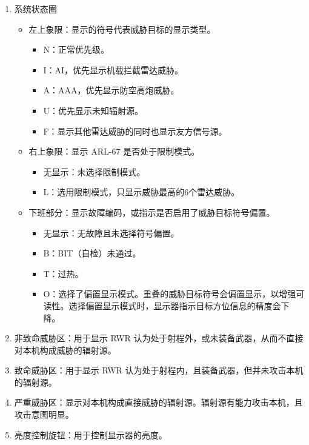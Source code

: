 \begin{enumerate}
	\item 系统状态圈
	      \begin{itemize}
		      \item 左上象限：显示的符号代表威胁目标的显示类型。
		            \begin{itemize}
			            \item N：正常优先级。
			            \item I：AI，优先显示机载拦截雷达威胁。
			            \item A：AAA，优先显示防空高炮威胁。
			            \item U：优先显示未知辐射源。
			            \item F：显示其他雷达威胁的同时也显示友方信号源。
		            \end{itemize}
		      \item 右上象限：显示 ARL-67 是否处于限制模式。
		            \begin{itemize}
			            \item 无显示：未选择限制模式。
			            \item L：选用限制模式，只显示威胁最高的6个雷达威胁。
		            \end{itemize}
		      \item 下班部分：显示故障编码，或指示是否启用了威胁目标符号偏置。
		            \begin{itemize}
			            \item 无显示：无故障且未选择符号偏置。
			            \item B：BIT（自检）未通过。
			            \item T：过热。
			            \item O：选择了偏置显示模式。重叠的威胁目标符号会偏置显示，以增强可读性。选择偏置显示模式时，显示器指示目标方位信息的精度会下降。
		            \end{itemize}
	      \end{itemize}
	\item 非致命威胁区：用于显示 RWR 认为处于射程外，或未装备武器，从而不直接对本机构成威胁的辐射源。
	\item 致命威胁区：用于显示 RWR 认为处于射程内，且装备武器，但并未攻击本机的辐射源。
	\item 严重威胁区：显示对本机构成直接威胁的辐射源。辐射源有能力攻击本机，且攻击意图明显。
	\item 亮度控制旋钮：用于控制显示器的亮度。
\end{enumerate}


